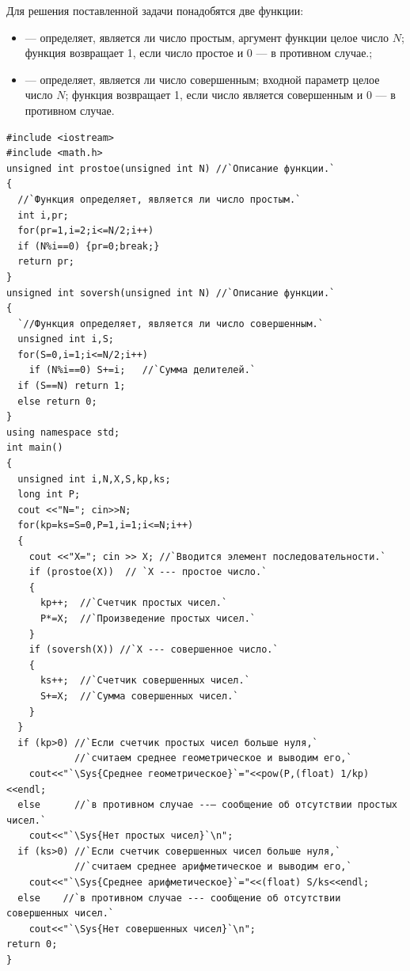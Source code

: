 Для решения поставленной задачи понадобятся две функции: 
\begin{itemize}
\item {} --- определяет, является ли число простым, аргумент функции целое число
$N$; функция возвращает 1, если число простое и 0 --- в противном
случае.;

\item {} --- определяет, является ли число совершенным; входной параметр целое число
$N$; функция возвращает 1, если число является совершенным и 0 --- в
противном случае.
\end{itemize}
\begin{lstlisting}
#include <iostream>
#include <math.h>
unsigned int prostoe(unsigned int N) //`Описание функции.`
{
  //`Функция определяет, является ли число простым.`
  int i,pr;
  for(pr=1,i=2;i<=N/2;i++)
  if (N%i==0) {pr=0;break;}
  return pr;
}
unsigned int soversh(unsigned int N) //`Описание функции.`
{
  `//Функция определяет, является ли число совершенным.`
  unsigned int i,S;
  for(S=0,i=1;i<=N/2;i++)
    if (N%i==0) S+=i; 	//`Сумма делителей.`
  if (S==N) return 1;
  else return 0;
}
using namespace std;
int main()
{
  unsigned int i,N,X,S,kp,ks;
  long int P;
  cout <<"N="; cin>>N;
  for(kp=ks=S=0,P=1,i=1;i<=N;i++)
  {
    cout <<"X="; cin >> X; //`Вводится элемент последовательности.`
    if (prostoe(X))  // `X --- простое число.`		
    {
      kp++;  //`Счетчик простых чисел.`
      P*=X;  //`Произведение простых чисел.`
    }
    if (soversh(X)) //`X --- совершенное число.`
    {
      ks++;  //`Счетчик совершенных чисел.`
      S+=X;  //`Сумма совершенных чисел.`
    }
  }
  if (kp>0) //`Если счетчик простых чисел больше нуля,`
            //`считаем среднее геометрическое и выводим его,`
    cout<<"`\Sys{Среднее геометрическое}`="<<pow(P,(float) 1/kp)<<endl;
  else      //`в противном случае --– сообщение об отсутствии простых чисел.`
    cout<<"`\Sys{Нет простых чисел}`\n";
  if (ks>0) //`Если счетчик совершенных чисел больше нуля,` 
            //`считаем среднее арифметическое и выводим его,`
    cout<<"`\Sys{Среднее арифметическое}`="<<(float) S/ks<<endl;
  else    //`в противном случае --- сообщение об отсутствии совершенных чисел.`
    cout<<"`\Sys{Нет совершенных чисел}`\n";
return 0;
}
\end{lstlisting}


